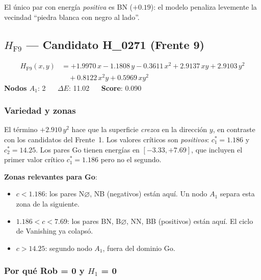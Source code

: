 \documentclass[11pt,a4paper]{article}
\newcommand{\dE}{\Delta E}
\begin{document}
El único par con energía \emph{positiva} es BN ($+0.19$):
el modelo penaliza levemente la vecindad ``piedra blanca con negro al lado''.

\subsection{\texorpdfstring{$H_{\text{F9}}$}{H\_F9} --- Candidato H\_0271 (Frente 9)}

\begin{tcolorbox}[hambox,title={$H_{\text{F9}}$ (H\_0271, \textcolor{cFrontMid}{Frente 9}) $\cdot$
  $H_1$-max = 0.000 $\cdot$ Rob = 0.000}]
\begin{align*}
  H_{\text{F9}}(x,y) &=
    +1.9970\,x - 1.1808\,y
    - 0.3611\,x^2 + 2.9137\,xy + 2.9103\,y^2 \\
  &\quad + 0.8122\,x^2y + 0.5969\,xy^2
\end{align*}
\textbf{Nodos $A_1$}: 2 $\quad$
\textbf{$\dE$}: 11.02 $\quad$
\textbf{Score}: 0.090
\end{tcolorbox}

\subsubsection*{Variedad y zonas}

El término $+2.910\,y^2$ hace que la superficie \emph{crezca} en la
dirección $y$, en contraste con los candidatos del Frente~1.
Los valores críticos son \emph{positivos}: $c^*_1=1.186$ y $c^*_2=14.25$.
Los pares Go tienen energías en $[-3.33, +7.69]$, que incluyen el primer
valor crítico $c^*_1=1.186$ pero no el segundo.

\textbf{Zonas relevantes para Go}:
\begin{itemize}[noitemsep]
  \item $c < 1.186$: los pares N$\varnothing$, NB (negativos) están aquí.
        Un nodo $A_1$ separa esta zona de la siguiente.
  \item $1.186 < c < 7.69$: los pares BN, B$\varnothing$, NN, BB (positivos)
        están aquí. El ciclo de Vanishing ya colapsó.
  \item $c > 14.25$: segundo nodo $A_1$, fuera del dominio Go.
\end{itemize}

\subsubsection*{Por qué Rob = 0 y $H_1$ = 0}
\end{document}
